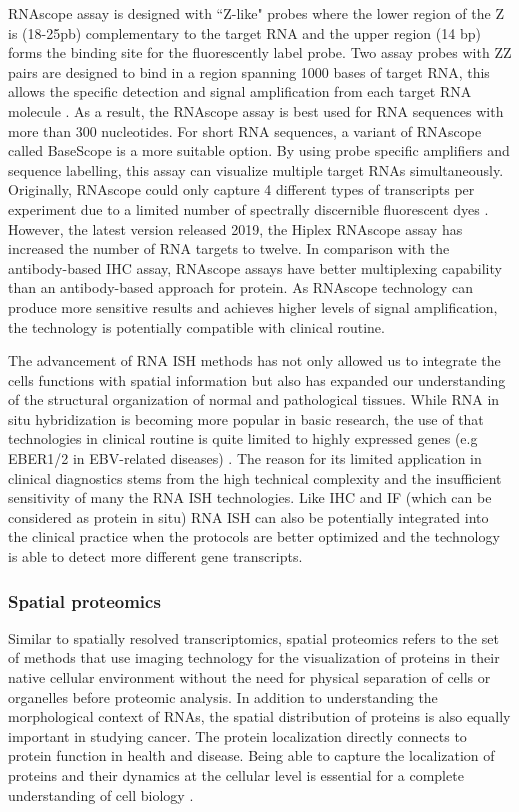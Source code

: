 RNAscope assay is designed with ``Z-like" probes where the lower region of the Z is (18-25pb) complementary to the target RNA and the upper region (14 bp) forms the binding site for the fluorescently label probe. Two assay probes with ZZ pairs are designed to bind in a region spanning 1000 bases of target RNA, this allows the specific detection and signal amplification from each target RNA molecule \cite{solanki2020visualization}. As a result, the RNAscope assay is best used for RNA sequences with more than 300 nucleotides. For short RNA sequences, a variant of RNAscope called BaseScope is a more suitable option. By using probe specific amplifiers and sequence labelling, this assay can visualize multiple target RNAs simultaneously. Originally, RNAscope could only capture 4 different types of transcripts per experiment due to a limited number of spectrally discernible fluorescent dyes \cite{wang2012rnascope}. However, the latest version released 2019, the Hiplex RNAscope assay has increased the number of RNA targets to twelve. In comparison with the antibody-based IHC assay, RNAscope assays have better multiplexing capability than an antibody-based approach for protein. As RNAscope technology can produce more sensitive results and achieves higher levels of signal amplification, the technology is potentially compatible with clinical routine.

The advancement of RNA ISH methods has not only allowed us to integrate the cells functions with spatial information but also has expanded our understanding of the structural organization of normal and pathological tissues. While RNA in situ hybridization is becoming more popular in basic research, the use of that technologies in clinical routine is quite limited to highly expressed genes (e.g EBER1/2 in EBV-related diseases) \cite{gulley2001molecular}. The reason for its limited application in clinical diagnostics stems from the high technical complexity and the insufficient sensitivity of many the RNA ISH technologies. Like IHC and IF (which can be considered as protein in situ) RNA ISH can also be potentially integrated into the clinical practice when the protocols are better optimized and the technology is able to detect more different gene transcripts.

\subsubsection{Spatial proteomics}
Similar to spatially resolved transcriptomics, spatial proteomics refers to the set of methods that use imaging technology for the visualization of proteins in their native cellular environment without the need for physical separation of cells or organelles before proteomic analysis. In addition to understanding the morphological context of RNAs, the spatial distribution of proteins is also equally important in studying cancer. The protein localization directly connects to protein function in health and disease. Being able to capture the localization of proteins and their dynamics at the cellular level is essential for a complete understanding of cell biology \cite{lundberg2019spatial}. 

